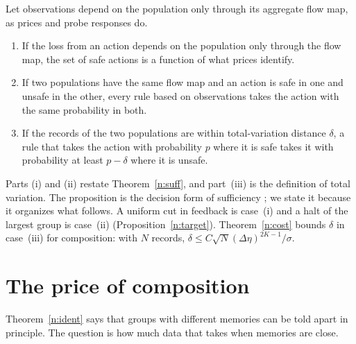 \begin{proposition}\label{n:interv}
Let observations depend on the population only through its aggregate flow map, as prices and probe responses do.
\begin{enumerate}[label=(\roman*),itemsep=1pt]
\item If the loss from an action depends on the population only through the flow map, the set of safe actions is a function of what prices identify.
\item If two populations have the same flow map and an action is safe in one and unsafe in the other, every rule based on observations takes the action with the same probability in both.
\item If the records of the two populations are within total-variation distance $\delta$, a rule that takes the action with probability $p$ where it is safe takes it with probability at least $p-\delta$ where it is unsafe.
\end{enumerate}
\end{proposition}

Parts (i) and (ii) restate Theorem~\ref{n:suff}, and part~(iii) is the definition of total variation. The proposition is the decision form of sufficiency \citep{blackwell1953,lecam1964}; we state it because it organizes what follows. A uniform cut in feedback is case~(i) and a halt of the largest group is case~(ii) (Proposition~\ref{n:target}). Theorem~\ref{n:cost} bounds $\delta$ in case~(iii) for composition: with $N$ records, $\delta\le C\sqrt N(\Delta\eta)^{2K-1}/\sigma$.

\section{The price of composition}\label{n:cost_sec}

Theorem~\ref{n:ident} says that groups with different memories can be told apart in principle. The question is how much data that takes when memories are close.

